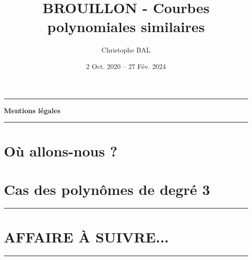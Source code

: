 \documentclass[12pt]{amsart}
\newcommand\contentdir{\jobname}
\begin{document}
\title{BROUILLON - Courbes polynomiales similaires}
\author{Christophe BAL}
\date{2 Oct. 2020 -- 27 Fév. 2024}
\maketitle


\begin{center}
	\hrule\vspace{.3em}
	{
		\fontsize{1.35em}{1em}\selectfont
		\textbf{Mentions \og légales \fg}
	}
			
	\vspace{0.45em}
	\doclicenseThis
	\hrule
\end{center}



\setcounter{tocdepth}{2}
\tableofcontents




\newpage
\section{Où allons-nous ?}






\section{Cas des polynômes de degré 3} 





%
%
%
%




\newpage
\bigskip

\hrule

\section{AFFAIRE À SUIVRE...}

\bigskip

\hrule
\end{document}
